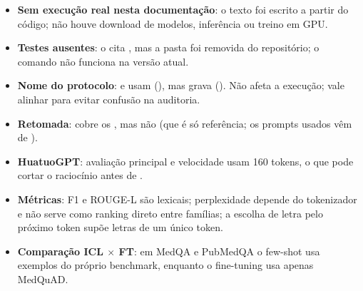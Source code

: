 \documentclass[11pt]{article}
\begin{document}
\begin{itemize}
\item \textbf{Sem execução real nesta documentação}: o texto foi escrito a partir do código; não houve download de modelos, inferência ou treino em GPU.
\item \textbf{Testes ausentes}: o  cita , mas a pasta  foi removida do repositório; o comando não funciona na versão atual.
\item \textbf{Nome do protocolo}:  e  usam  (), mas  grava  (). Não afeta a execução; vale alinhar para evitar confusão na auditoria.
\item \textbf{Retomada}:  cobre os , mas não  (que é só referência; os prompts usados vêm de ).
\item \textbf{HuatuoGPT}: avaliação principal e velocidade usam 160 tokens, o que pode cortar o raciocínio antes de .
\item \textbf{Métricas}: F1 e ROUGE-L são lexicais; perplexidade depende do tokenizador e não serve como ranking direto entre famílias; a escolha de letra pelo próximo token supõe letras de um único token.
\item \textbf{Comparação ICL $\times$ FT}: em MedQA e PubMedQA o few-shot usa exemplos do próprio benchmark, enquanto o fine-tuning usa apenas MedQuAD.
\end{itemize}
\end{document}
